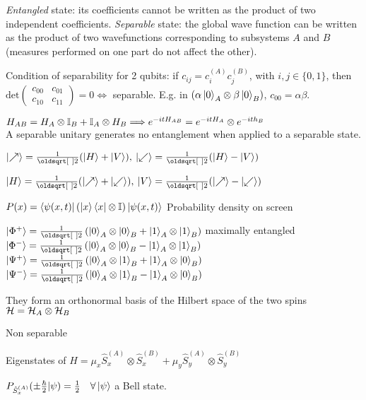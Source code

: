 \begin{squishlist}
    \item \emph{Entangled} state: its coefficients cannot be written as the product of two independent coefficients. 
        \emph{Separable} state: the global wave function can be written as the product of two wavefunctions corresponding to subsystems $A$ and $B$ (measures performed on one part do not affect the other).
    \item Condition of separability for 2 qubits: if $c_{ij} = c^{(A)}_i c^{(B)}_j$, with $i,j\in \{0,1\}$, then
        $\mathrm{det} \begin{pmatrix} c_{00} & c_{01} \\ c_{10} & c_{11} \end{pmatrix} = 0 \Leftrightarrow $ separable. E.g. in $\left(\alpha \ket{0}_A \otimes \beta \ket{0}_B\right)$, $c_{00} = \alpha \beta$.
    \item $H_{AB} = H_A \otimes \mathbb{I}_B + \mathbb{I}_A \otimes H_B \Longrightarrow e^{-itH_{AB}} = e^{-itH_A} \otimes e^{-ith_B}$ \\ A separable unitary generates no entanglement when applied to a separable state.
\end{squishlist}

\columnbreak

\begin{squishlist}
    \item $\ket{\nearrow} = \frac{1}{\sqrt{2}}(\ket{H}+\ket{V}),\: \ket{\swarrow} = \frac{1}{\sqrt{2}}(\ket{H} - \ket{V})$
    \item $\ket{H} = \frac{1}{\sqrt{2}}(\ket{\nearrow} + \ket{\swarrow}),\: \ket{V} = \frac{1}{\sqrt{2}}(\ket{\nearrow} - \ket{\swarrow})$
    \item $P(x) = \braket{\psi(x,t)|\left(\ket{x}\bra{x} \otimes \mathbb{I}\right)| \psi(x,t)}$ Probability density on screen
\end{squishlist}


\begin{squishlist}
    \item $\ket{\Phi^+} = \frac{1}{\sqrt{2}} \left( \ket{0}_A \otimes \ket{0}_B + \ket{1}_A \otimes \ket{1}_B\right)$ \hfill maximally entangled\\
          $\ket{\Phi^-} = \frac{1}{\sqrt{2}} \left( \ket{0}_A \otimes \ket{0}_B - \ket{1}_A \otimes \ket{1}_B\right)$ \\
          $\ket{\Psi^+} = \frac{1}{\sqrt{2}} \left( \ket{0}_A \otimes \ket{1}_B + \ket{1}_A \otimes \ket{0}_B\right)$ \\
          $\ket{\Psi^-} = \frac{1}{\sqrt{2}} \left( \ket{0}_A \otimes \ket{1}_B - \ket{1}_A \otimes \ket{0}_B\right)$
    \item They form an orthonormal basis of the Hilbert space of the two spins $\mathcal{H} = \mathcal{H}_A \otimes \mathcal{H}_B$
    \item Non separable
    \item Eigenstates of $\hat{H} = \mu_x \hat{S}_x^{(A)} \otimes \hat{S}_x^{(B)} + \mu_y \hat{S}_y^{(A)} \otimes \hat{S}_y^{(B)}$
    \item $P_{\hat{S}_x^{(A)}}(\pm \frac{\hbar}{2} | \psi) = \frac{1}{2} \quad \forall \ket{\psi} $ a Bell state. 
\end{squishlist}


